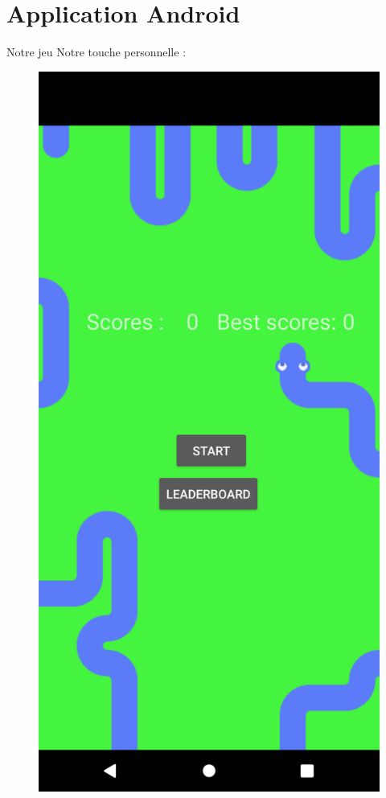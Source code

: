 \documentclass{beamer}
\begin{document}
\section{Application Android}
%
%
\begin{frame}{Notre jeu}
Notre touche personnelle :
    \begin{figure}[H]
    \begin{minipage}[H]{0.25\linewidth}
        \centering
        \includegraphics[scale=0.05]{MenuActi.png}

\end{minipage}
\end{figure}
\end{frame}
\end{document}
